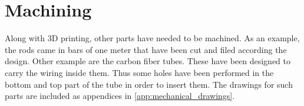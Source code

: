 \section{Machining} %
\label{sec:machining}
Along with 3D printing, other parts have needed to be machined.
As an example, the rods came in bars of one meter that have been cut and filed according the design.
Other example are the carbon fiber tubes.
These have been designed to carry the wiring inside them.
Thus some holes have been performed in the bottom and top part of the tube in order to insert them.
The drawings for such parts are included as appendices in \ref{app:mechanical_drawings}.
